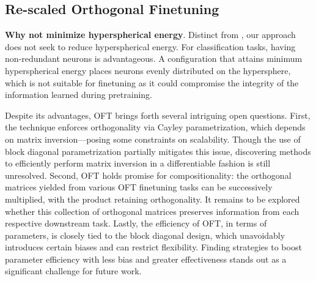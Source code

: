 \begin{itemize}[leftmargin=*,nosep]

\subsection{Re-scaled Orthogonal Finetuning}

\textbf{Why not minimize hyperspherical energy}. Distinct from \cite{liu2021orthogonal}, our approach does not seek to reduce hyperspherical energy. For classification tasks, having non-redundant neurons is advantageous. A configuration that attains minimum hyperspherical energy places neurons evenly distributed on the hypersphere, which is not suitable for finetuning as it could compromise the integrity of the information learned during pretraining.

Despite its advantages, OFT brings forth several intriguing open questions. First, the technique enforces orthogonality via Cayley parametrization, which depends on matrix inversion—posing some constraints on scalability. Though the use of block diagonal parametrization partially mitigates this issue, discovering methods to efficiently perform matrix inversion in a differentiable fashion is still unresolved. Second, OFT holds promise for compositionality: the orthogonal matrices yielded from various OFT finetuning tasks can be successively multiplied, with the product retaining orthogonality. It remains to be explored whether this collection of orthogonal matrices preserves information from each respective downstream task. Lastly, the efficiency of OFT, in terms of parameters, is closely tied to the block diagonal design, which unavoidably introduces certain biases and can restrict flexibility. Finding strategies to boost parameter efficiency with less bias and greater effectiveness stands out as a significant challenge for future work.



\end{itemize}
